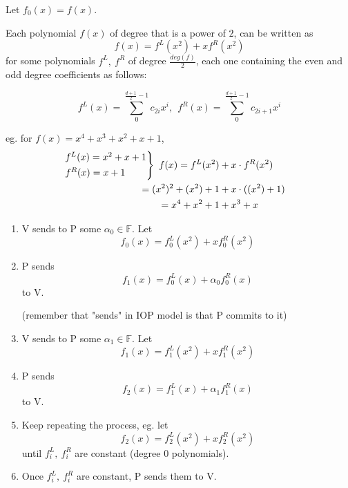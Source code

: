 \documentclass{article}
\theoremstyle{definition}
\begin{document}
Let $f_0(x)=f(x)$.

Each polynomial $f(x)$ of degree that is a power of $2$, can be written as
$$f(x) = f^L(x^2) + x f^R(x^2)$$
for some polynomials $f^L,~f^R$ of degree $\frac{deg(f)}{2}$, each one containing the even and odd degree coefficients as follows:


$$f^L(x)= \sum_0^{\frac{d+1}{2}-1} c_{2i} x^i ,~~ f^R(x)= \sum_0^{\frac{d+1}{2}-1} c_{2i+1} x^i$$

eg. for $f(x)=x^4+x^3+x^2+x+1$,
\begin{align*}
	\begin{rcases}
	f^L(x)=x^2+x+1\\
	f^R(x)=x+1
	\end{rcases}
	~f(x) = f^L(x^2) &+ x \cdot f^R(x^2)\\
	= (x^2)^2 + (x^2) + 1 &+ x \cdot ((x^2) + 1)\\
	= x^4 + x^2 + 1 &+ x^3 + x
\end{align*}

\begin{enumerate}
	\item V sends to P some $\alpha_0 \in \mathbb{F}$.
		Let
		\begin{equation}\tag{$A_0$}
			f_0(x) = f_0^L(x^2) + x f_0^R(x^2)
		\end{equation}
	\item P sends
		\begin{equation}\tag{$B_0$}
			f_1(x) = f_0^L(x) + \alpha_0 f_0^R(x)
		\end{equation}
		to V.

		(remember that "sends" in IOP model is that P commits to it)
	\item V sends to P some $\alpha_1 \in \mathbb{F}$.
		Let
		\begin{equation}\tag{$A_1$}
			f_1(x) = f_1^L(x^2) + x f_1^R(x^2)
		\end{equation}
	\item P sends
		\begin{equation}\tag{$B_1$}
			f_2(x) = f_1^L(x) + \alpha_1 f_1^R(x)
		\end{equation}
		to V.
	\item Keep repeating the process, eg. let
		\begin{equation}\tag{$A_2$}
			f_2(x) = f_2^L(x^2) + x f_2^R(x^2)
		\end{equation}
		until $f_i^L,~ f_i^R$ are constant (degree 0 polynomials).
	\item Once $f_i^L,~ f_i^R$ are constant, P sends them to V.
\end{enumerate}
\end{document}
